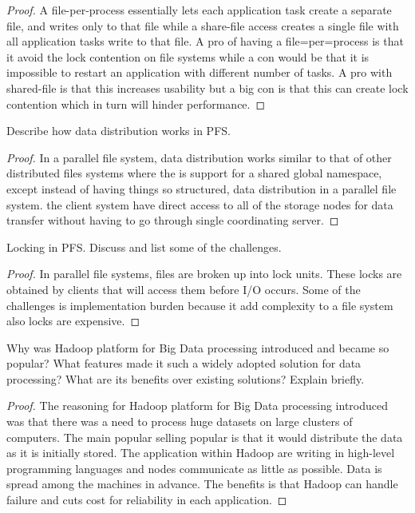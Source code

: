 \documentclass[12pt]{article}
\newenvironment{exercise}[2][Exercise]{\begin{trivlist}
\item[\hskip \labelsep {\bfseries #1}\hskip \labelsep {\bfseries #2.}]}{\end{trivlist}}
\begin{document}
\begin{proof}
A file-per-process essentially lets each application task create a separate file, and writes only to that file while a share-file access creates a single file with all application tasks write to that file. A pro of having a file=per=process is that it avoid the lock contention on file systems while a con would be that it is impossible to restart an application with different number of tasks. A pro with shared-file is that this increases usability but a big con is that this can create lock contention which in turn will hinder performance.
\end{proof}
 
\begin{exercise}{4}
Describe how data distribution works in PFS. 
\end{exercise}

\begin{proof}
In a parallel file system, data distribution works similar to that of other distributed files systems where the is support for a shared global namespace, except instead of having things so structured, data distribution in a parallel file system. the client system have direct access to all of the storage nodes for data transfer without having to go through single coordinating server. 
\end{proof}

\begin{exercise}{5}
Locking in PFS. Discuss and list some of the challenges. 
\end{exercise}

\begin{proof}
In parallel file systems, files are broken up into lock units. These locks are obtained by clients that will access them before I/O occurs. 
Some of the challenges is implementation burden because it add complexity to a file system also locks are expensive. 
\end{proof}

\begin{exercise}{6}
Why was Hadoop platform for Big Data processing introduced and became so popular? What features made it such a widely adopted solution for data processing? What are its benefits over existing solutions? Explain briefly. 
\end{exercise}

\begin{proof}
The reasoning for Hadoop platform for Big Data processing introduced was that there was a need to process huge datasets on large clusters of computers. The main popular selling popular is that it would distribute the data as it is initially stored. The application within Hadoop are writing in high-level programming languages and nodes communicate as little as possible. Data is spread among the machines in advance. The benefits is that Hadoop can handle failure and cuts cost for reliability in each application. 
\end{proof}
\end{document}
